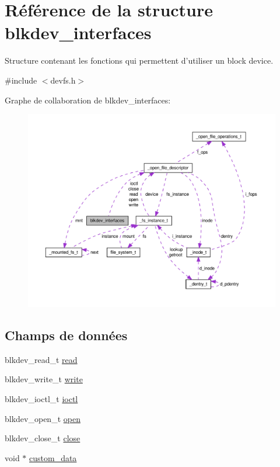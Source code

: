 \hypertarget{structblkdev__interfaces}{\section{Référence de la structure blkdev\-\_\-interfaces}
\label{structblkdev__interfaces}
}


Structure contenant les fonctions qui permettent d'utiliser un block device.  




{\ttfamily \#include $<$devfs.\-h$>$}



Graphe de collaboration de blkdev\-\_\-interfaces\-:\nopagebreak
\begin{figure}[H]
\begin{center}
\leavevmode
\includegraphics[width=350pt]{structblkdev__interfaces__coll__graph}
\end{center}
\end{figure}
\subsection*{Champs de données}
\begin{DoxyCompactItemize}
\item 
blkdev\-\_\-read\-\_\-t \hyperlink{structblkdev__interfaces_ad14a2ad714105cdb8ce002eb4fb9e747}{read}
\item 
blkdev\-\_\-write\-\_\-t \hyperlink{structblkdev__interfaces_ae99fb7e1529ef6c24df9dc454bc0f9f6}{write}
\item 
blkdev\-\_\-ioctl\-\_\-t \hyperlink{structblkdev__interfaces_ae93720624e6f1a1ea33e31bf1da4c097}{ioctl}
\item 
blkdev\-\_\-open\-\_\-t \hyperlink{structblkdev__interfaces_a08eaa39b105826d2780991b32577867a}{open}
\item 
blkdev\-\_\-close\-\_\-t \hyperlink{structblkdev__interfaces_ab7623005e31211894853b3524e1e74eb}{close}
\item 
void $\ast$ \hyperlink{structblkdev__interfaces_a8eea79e70042c41cc171796b501a9fd1}{custom\-\_\-data}
\end{DoxyCompactItemize}


